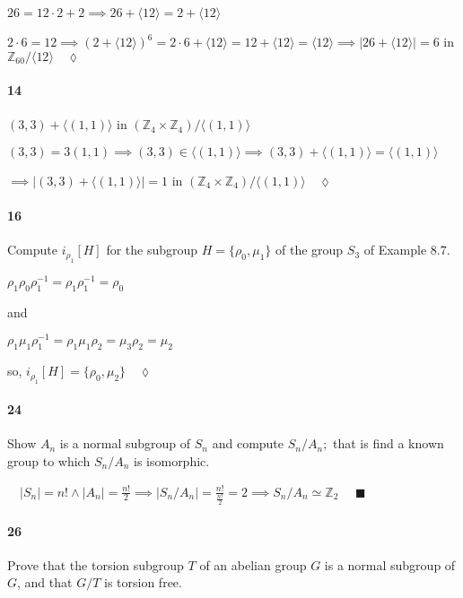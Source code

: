 \documentclass{article}
\newcommand\Z{\mathbb{Z}}
\begin{document}

$26 = 12\cdot 2 + 2 \implies 26 + \langle 12 \rangle = 2 + \langle 12
\rangle$

$2\cdot 6 = 12 \implies (2+\langle 12 \rangle)^6 = 2\cdot 6 +\langle
12 \rangle  = 12 +\langle 12 \rangle = \langle 12 \rangle \implies
|26+\langle 12 \rangle| = 6$ in $\Z_{60}/\langle 12
\rangle\quad \lozenge$

\paragraph{14} $(3,3)+\langle (1,1) \rangle$ in $(\Z_4\times \Z_4)/\langle (1,1) \rangle$


$(3,3) = 3(1,1) \implies (3,3)\in \langle (1,1) \rangle \implies
(3,3)+\langle (1,1) \rangle = \langle (1,1) \rangle $

$\implies |(3,3) +
\langle (1,1) \rangle| = 1$ in $(\Z_4\times \Z_4)/\langle (1,1)
\rangle \quad \lozenge$

\paragraph{16} Compute $i_{\rho_1}[H]$ for the subgroup $H=
\{\rho_0,\mu_1\}$ of the group $S_3$ of Example $8.7.$


$\rho_1\rho_0\rho_1^{-1}=\rho_1\rho_1^{-1} = \rho_0$

and

$\rho_1\mu_1\rho_1^{-1} = \rho_1\mu_1\rho_2 = \mu_3\rho_2 = \mu_2$

so, $i_{\rho_1}[H] = \{\rho_0,\mu_2\} \quad \lozenge$

\paragraph{24} Show $A_n$ is a normal subgroup of $S_n$ and compute
$S_n/A_n;$ that is find a known group to which $S_n/A_n$ is
isomorphic.

 $\quad |S_n| = n!\land |A_n| = \frac{n!}{2} \implies
|S_n/A_n| = \frac{n!}{\frac{n!}{2}} = 2 \implies S_n/A_n \simeq \Z_2$
$\quad \blacksquare$

\paragraph{26} Prove that the torsion subgroup $T$ of an abelian group
$G$ is a normal subgroup of $G$, and that $G/T$ is torsion free.
\end{document}

